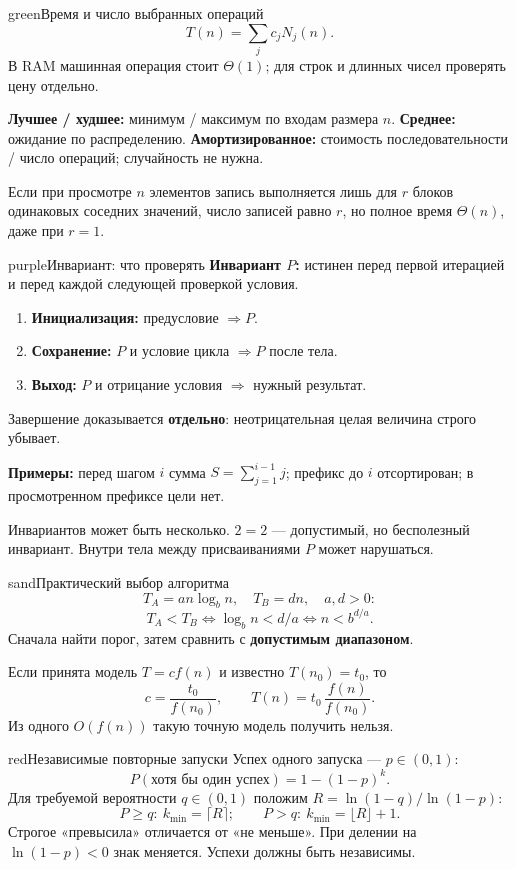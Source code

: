\documentclass[a4paper,10pt]{article}
\newcommand{\key}[1]{\textbf{#1}}
\newlength{\colmax}
\newcounter{cheatcolnum}
\newenvironment{sheetcol}[1][.486\textwidth]{%
 \begin{lrbox}{\cheatcol}\begin{minipage}[t]{#1}\vspace{0pt}
}{%
 \end{minipage}\end{lrbox}\stepcounter{cheatcolnum}%
 \typeout{CHEAT-COLUMN-\thecheatcolnum: \the\dimexpr\ht\cheatcol+\dp\cheatcol\relax; LIMIT \the\colmax}%
 \ifdim\dimexpr\ht\cheatcol+\dp\cheatcol\relax>\colmax
 \PackageError{cheat}{Column \thecheatcolnum\space exceeds planned height}{Shorten content; keep body text at least 10pt.}\fi
 \usebox{\cheatcol}}
\begin{document}
\begin{sheetcol}
\begin{card}{green}{Время и число выбранных операций\smash{\textsuperscript{*}}}
\[
T(n)=\sum_j c_jN_j(n).
\]
В RAM машинная операция стоит $\Theta(1)$;
для строк и длинных чисел проверять цену отдельно.

\key{Лучшее / худшее:} минимум / максимум по входам размера $n$.
\key{Среднее:} ожидание по распределению.
\key{Амортизированное:} стоимость последовательности /
число операций; случайность не нужна.

Если при просмотре $n$ элементов запись выполняется
лишь для $r$ блоков одинаковых соседних значений,
число записей равно $r$, но полное время $\Theta(n)$,
даже при $r=1$.
\end{card}

\begin{card}{purple}{Инвариант: что проверять\smash{\textsuperscript{*}}}
\key{Инвариант $P$:} истинен перед первой итерацией
и перед каждой следующей проверкой условия.
\begin{enumerate}
\item \key{Инициализация:} предусловие $\Rightarrow P$.
\item \key{Сохранение:} $P$ и условие цикла
$\Rightarrow P$ после тела.
\item \key{Выход:} $P$ и отрицание условия
$\Rightarrow$ нужный результат.
\end{enumerate}
Завершение доказывается \key{отдельно}:
неотрицательная целая величина строго убывает.

\key{Примеры:} перед шагом $i$ сумма
$S=\sum_{j=1}^{i-1}j$; префикс до $i$ отсортирован;
в просмотренном префиксе цели нет.

Инвариантов может быть несколько.
$2=2$ --- допустимый, но бесполезный инвариант.
Внутри тела между присваиваниями $P$ может нарушаться.
\end{card}

\begin{card}{sand}{Практический выбор алгоритма\smash{\textsuperscript{*}}}
\[
T_A=an\log_b n,\quad T_B=dn,\quad a,d>0:
\]
\[
T_A<T_B\iff\log_b n<d/a\iff n<b^{d/a}.
\]
Сначала найти порог, затем сравнить с \key{допустимым диапазоном}.

Если принята модель $T=cf(n)$ и известно
$T(n_0)=t_0$, то
\[
c=\frac{t_0}{f(n_0)},\qquad
T(n)=t_0\,\frac{f(n)}{f(n_0)}.
\]
Из одного $O(f(n))$ такую точную модель получить нельзя.
\end{card}

\begin{card}{red}{Независимые повторные запуски\smash{\textsuperscript{*}}}
Успех одного запуска --- $p\in(0,1)$:
\[
P(\text{хотя бы один успех})=1-(1-p)^k.
\]
Для требуемой вероятности $q\in(0,1)$ положим
$R=\ln(1-q)/\ln(1-p)$:
\[
P\ge q:\ k_{\min}=\lceil R\rceil;\qquad
P>q:\ k_{\min}=\lfloor R\rfloor+1.
\]
Строгое «превысила» отличается от «не меньше».
При делении на $\ln(1-p)<0$ знак меняется.
Успехи должны быть независимы.
\end{card}
\end{sheetcol}
\newpage
\end{document}

